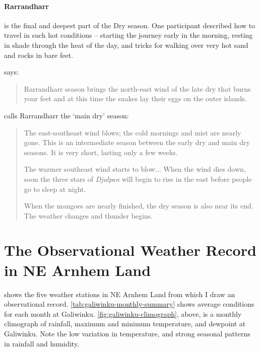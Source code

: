 \paragraph{Rarrandharr} is the final and deepest part of the Dry season.
One participant described how to travel in such hot conditions -- starting
the journey early in the morning, resting in shade through the heat of the
day, and tricks for walking over very hot sand and rocks in bare feet.

\citet[][p36]{atlas2014} says: \blockquote{
    Rarrandharr season brings the north-east wind of the late dry that
    burns your feet and at this time the snakes lay their eggs on the
    outer islands.
}

\citet{davis1989} calls Rarrandharr the `main dry' season:
\blockquote{
    The east-southeast wind blows; the cold mornings and mist are nearly gone.
    This is an intermediate season between the early dry and main dry seasons.
    It is very short, lasting only a few weeks.

    The warmer southeast wind starts to blow...
    When the wind dies down, soon the three stars of \textit{Djulpan}
    will begin to rise in the east before people go to sleep at night.

    When the mangoes are nearly finished, the dry season is also near its end.
    The weather changes and thunder begins.
}




\section{The Observational Weather Record in NE Arnhem Land}

 shows the five weather stations in NE
Arnhem Land from which I draw an observational record.
\cref{tab:galiwinku-monthly-summary} shows average conditions for each
month at Galiwinku.  \cref{fig:galiwinku-climograph}, above, is a monthly
climograph of rainfall, maximum and minimum temperature, and dewpoint at
Galiwinku.  Note the low variation in temperature, and strong seasonal
patterns in rainfall and humidity.

~\\



